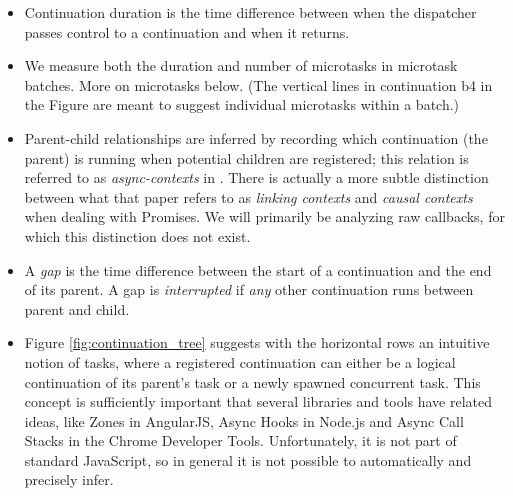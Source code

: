 \documentclass[acmsmall,anonymous,review]{acmart}\settopmatter{printfolios=true,printccs=false,printacmref=false}
\begin{document}
\begin{itemize}
\item Continuation duration is the time difference between when the dispatcher passes control to a continuation and when it returns.
\item We measure both the duration and number of microtasks in microtask batches.
  More on microtasks below.
  (The vertical lines in continuation \textsf{b4} in the Figure are meant to suggest individual microtasks within a batch.)
\item Parent-child relationships are inferred by recording which continuation (the parent) is running when potential children are registered; this relation is referred to as \emph{async-contexts} in \cite{Loring2017}.
  There is actually a more subtle distinction between what that paper refers to as \emph{linking contexts} and \emph{causal contexts} when dealing with Promises.
  We will primarily be analyzing raw callbacks, for which this distinction does not exist.
\item A \emph{gap} is the time difference between the start of a continuation and the end of its parent.
  A gap is \emph{interrupted} if \emph{any} other continuation runs between parent and child.
\item Figure \ref{fig:continuation_tree} suggests with the horizontal rows an intuitive notion of tasks, where a registered continuation can either be a logical continuation of its parent's task or a newly spawned concurrent task.
  This concept is sufficiently important that several libraries and tools have related ideas, like Zones in AngularJS, Async Hooks in Node.js and Async Call Stacks in the Chrome Developer Tools.
  Unfortunately, it is not part of standard JavaScript, so in general it is not possible to automatically and precisely infer.
\end{itemize}

\end{document}

